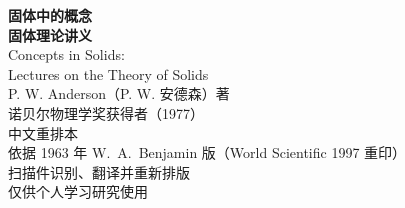 \documentclass[11pt,a4paper,twoside,openright]{ctexbook}
\begin{document}
\frontmatter
\begin{titlepage}
\centering
{\Huge\bfseries 固体中的概念\\[0.6em]}
{\LARGE\bfseries 固体理论讲义\\[2.5em]}
{\Large Concepts in Solids:\\ Lectures on the Theory of Solids\\[3em]}
{\Large P. W. Anderson（P. W. 安德森）\quad 著\\[1em]}
{\large 诺贝尔物理学奖获得者（1977）\\[5em]}
{\large 中文重排本\\[0.5em]}
{\large 依据 1963 年 W.~A.~Benjamin 版（World Scientific 1997 重印）\\[0.3em]
扫描件识别、翻译并重新排版\\[0.3em]
仅供个人学习研究使用\\[3em]}
\end{titlepage}
\thispagestyle{empty}\mbox{}\clearpage
\tableofcontents



\mainmatter






\end{document}
